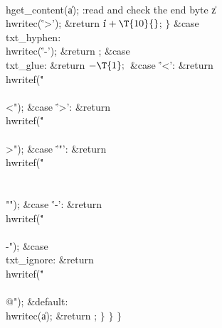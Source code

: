 \\{hget\_content}(\|a);\6
:read and check the end byte \|z\X\6
\\{hwritec}(\.{'>'});\5
\&{return} \|i${}+\T{10}{}$;\6
\4${}\}{}$\2\6
\4\&{case} \\{txt\_hyphen}:\5
\\{hwritec}(\.{'-'});\5
\&{return} ;\6
\4\&{case} \\{txt\_glue}:\5
\&{return} ${}{-}\T{1};{}$\6
\4\&{case} \.{'<'}:\5
\&{return} \\{hwritef}(\.{"\\\\<"});\6
\4\&{case} \.{'>'}:\5
\&{return} \\{hwritef}(\.{"\\\\>"});\6
\4\&{case} \.{'"'}:\5
\&{return} \\{hwritef}(\.{"\\\\\\""});\6
\4\&{case} \.{'-'}:\5
\&{return} \\{hwritef}(\.{"\\\\-"});\6
\4\&{case} \\{txt\_ignore}:\5
\&{return} \\{hwritef}(\.{"\\\\@"});\6
\4\&{default}:\5
\\{hwritec}(\|a);\5
\&{return} ;\6
\4${}\}{}$\2\6
\4${}\}{}$\2\6
\4${}\}{}$\2
\Y
\fi



